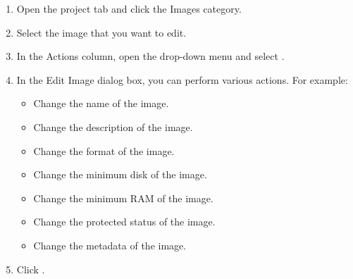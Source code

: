 \begin{enumerate}
\item Open the project tab and click the Images category.
\item Select the image that you want to edit.
\item In the Actions column, open the drop-down menu and select
  .
\item In the Edit Image dialog box, you can perform various
  actions. For example:
  \begin{itemize}
  \item    Change the name of the image.
  \item    Change the description of the image.
  \item    Change the format of the image.
  \item    Change the minimum disk of the image.
  \item    Change the minimum RAM of the image.
  \item    Change the protected status of the image.
  \item    Change the metadata of the image.
  \end{itemize}
\item  Click .
\end{enumerate}


